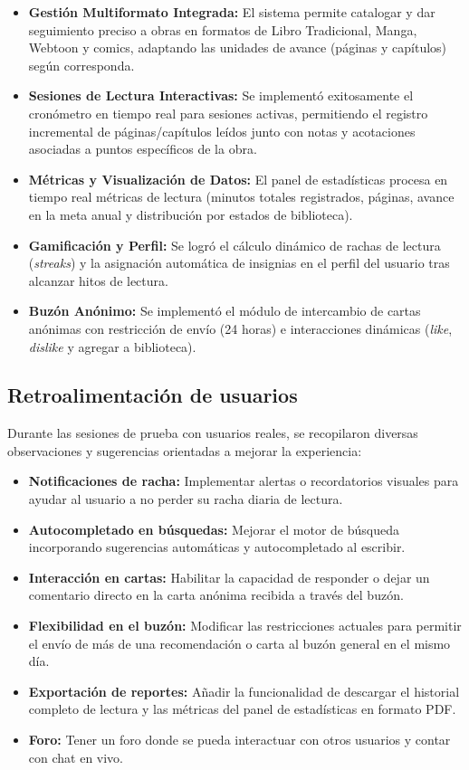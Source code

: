 \documentclass[12pt, atypical, journal]{article}
\begin{document}
\begin{itemize}
    \item \textbf{Gestión Multiformato Integrada:} El sistema permite catalogar y dar seguimiento preciso a obras en formatos de Libro Tradicional, Manga, Webtoon y comics, adaptando las unidades de avance (páginas y capítulos) según corresponda.
   
    \item \textbf{Sesiones de Lectura Interactivas:} Se implementó exitosamente el cronómetro en tiempo real para sesiones activas, permitiendo el registro incremental de páginas/capítulos leídos junto con notas y acotaciones asociadas a puntos específicos de la obra.
   
    \item \textbf{Métricas y Visualización de Datos:} El panel de estadísticas procesa en tiempo real métricas de lectura (minutos totales registrados, páginas, avance en la meta anual y distribución por estados de biblioteca).
   
    \item \textbf{Gamificación y Perfil:} Se logró el cálculo dinámico de rachas de lectura (\textit{streaks}) y la asignación automática de insignias en el perfil del usuario tras alcanzar hitos de lectura.
   
    \item \textbf{Buzón Anónimo:} Se implementó el módulo de intercambio de cartas anónimas con restricción de envío (24 horas) e interacciones dinámicas (\textit{like}, \textit{dislike} y agregar a biblioteca).
\end{itemize}

\subsection{Retroalimentación de usuarios}
Durante las sesiones de prueba con usuarios reales, se recopilaron diversas observaciones y sugerencias orientadas a mejorar la experiencia:
\begin{itemize}
    \item \textbf{Notificaciones de racha:} Implementar alertas o recordatorios visuales para ayudar al usuario a no perder su racha diaria de lectura.
    \item \textbf{Autocompletado en búsquedas:} Mejorar el motor de búsqueda incorporando sugerencias automáticas y autocompletado al escribir.
    \item \textbf{Interacción en cartas:} Habilitar la capacidad de responder o dejar un comentario directo en la carta anónima recibida a través del buzón.
    \item \textbf{Flexibilidad en el buzón:} Modificar las restricciones actuales para permitir el envío de más de una recomendación o carta al buzón general en el mismo día.
    \item \textbf{Exportación de reportes:} Añadir la funcionalidad de descargar el historial completo de lectura y las métricas del panel de estadísticas en formato PDF.
    \item \textbf{Foro:} Tener un foro donde se pueda interactuar con otros usuarios y contar con chat en vivo.
\end{itemize}
\end{document}
